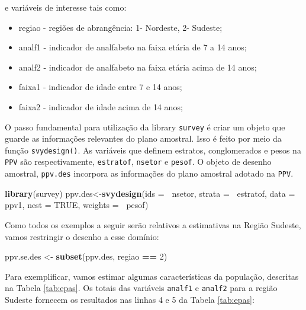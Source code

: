 \documentclass[]{book}
\newenvironment{Shaded}{\begin{snugshade}}{\end{snugshade}}
\newcommand{\KeywordTok}[1]{\textcolor[rgb]{0.13,0.29,0.53}{\textbf{#1}}}
\newcommand{\DataTypeTok}[1]{\textcolor[rgb]{0.13,0.29,0.53}{#1}}
\newcommand{\DecValTok}[1]{\textcolor[rgb]{0.00,0.00,0.81}{#1}}
\newcommand{\StringTok}[1]{\textcolor[rgb]{0.31,0.60,0.02}{#1}}
\newcommand{\OtherTok}[1]{\textcolor[rgb]{0.56,0.35,0.01}{#1}}
\newcommand{\OperatorTok}[1]{\textcolor[rgb]{0.81,0.36,0.00}{\textbf{#1}}}
\newcommand{\NormalTok}[1]{#1}
\providecommand{\tightlist}{%
  \setlength{\itemsep}{0pt}\setlength{\parskip}{0pt}}
\theoremstyle{definition}
\theoremstyle{definition}
\theoremstyle{definition}
\theoremstyle{remark}
\begin{document}
e variáveis de interesse tais como:

\begin{itemize}
\tightlist
\item
  regiao - regiões de abrangência: 1- Nordeste, 2- Sudeste;
\item
  analf1 - indicador de analfabeto na faixa etária de 7 a 14 anos;
\item
  analf2 - indicador de analfabeto na faixa etária acima de 14 anos;
\item
  faixa1 - indicador de idade entre 7 e 14 anos;
\item
  faixa2 - indicador de idade acima de 14 anos;
\end{itemize}

O passo fundamental para utilização da library \texttt{survey}
\citep{R-survey} é criar um objeto que guarde as informações relevantes
do plano amostral. Isso é feito por meio da função \texttt{svydesign()}.
As variáveis que definem estratos, conglomerados e pesos na \texttt{PPV}
são respectivamente, \texttt{estratof}, \texttt{nsetor} e
\texttt{pesof}. O objeto de desenho amostral, \texttt{ppv.des} incorpora
as informações do plano amostral adotado na \texttt{PPV}.

\begin{Shaded}
\begin{Highlighting}[]
\KeywordTok{library}\NormalTok{(survey)}
\NormalTok{ppv.des<-}\KeywordTok{svydesign}\NormalTok{(}\DataTypeTok{ids =} \OperatorTok{~}\NormalTok{nsetor, }\DataTypeTok{strata =} \OperatorTok{~}\NormalTok{estratof,}
\DataTypeTok{data =}\NormalTok{ ppv1, }\DataTypeTok{nest =} \OtherTok{TRUE}\NormalTok{, }\DataTypeTok{weights =} \OperatorTok{~}\NormalTok{pesof)}
\end{Highlighting}
\end{Shaded}

Como todos os exemplos a seguir serão relativos a estimativas na Região
Sudeste, vamos restringir o desenho a esse domínio:

\begin{Shaded}
\begin{Highlighting}[]
\NormalTok{ppv.se.des <-}\StringTok{ }\KeywordTok{subset}\NormalTok{(ppv.des, regiao }\OperatorTok{==}\StringTok{ }\DecValTok{2}\NormalTok{)}
\end{Highlighting}
\end{Shaded}

Para exemplificar, vamos estimar algumas características da população,
descritas na Tabela \ref{tab:epas}. Os totais das variáveis
\texttt{analf1} e \texttt{analf2} para a região Sudeste fornecem os
resultados nas linhas 4 e 5 da Tabela \ref{tab:epas}:
\end{document}
